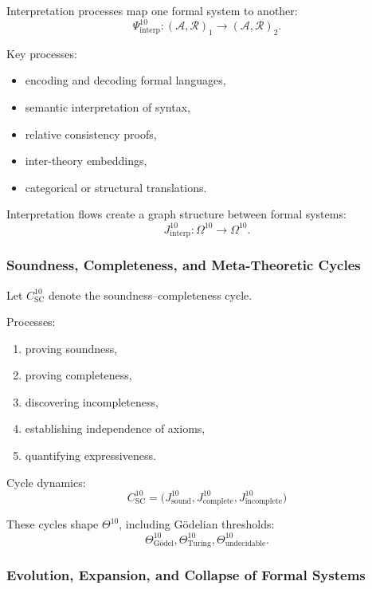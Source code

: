 Interpretation processes map one formal system to another:
\[
\Psi^{10}_{\text{interp}} :
(\mathcal{A},\mathcal{R})_1 \to (\mathcal{A},\mathcal{R})_2.
\]

Key processes:
\begin{itemize}
    \item encoding and decoding formal languages,
    \item semantic interpretation of syntax,
    \item relative consistency proofs,
    \item inter-theory embeddings,
    \item categorical or structural translations.
\end{itemize}

Interpretation flows create a graph structure between formal systems:
\[
J^{10}_{\text{interp}} : \Omega^{10} \to \Omega^{10}.
\]

\subsubsection{Soundness, Completeness, and Meta-Theoretic Cycles}

Let $C^{10}_{\text{SC}}$ denote the soundness–completeness cycle.

Processes:
\begin{enumerate}
    \item proving soundness,
    \item proving completeness,
    \item discovering incompleteness,
    \item establishing independence of axioms,
    \item quantifying expressiveness.
\end{enumerate}

Cycle dynamics:
\[
C^{10}_{\text{SC}} =
\big( J^{10}_{\text{sound}},
      J^{10}_{\text{complete}},
      J^{10}_{\text{incomplete}} \big)
\]

These cycles shape $\Theta^{10}$, including Gödelian thresholds:
\[
\Theta^{10}_{\text{Gödel}},
\Theta^{10}_{\text{Turing}},
\Theta^{10}_{\text{undecidable}}.
\]

\subsubsection{Evolution, Expansion, and Collapse of Formal Systems}

